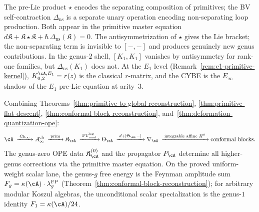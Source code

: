 \begin{remark}
\label{rem:pre-lie-quantization}
The pre-Lie product $\star$ encodes the separating
composition of primitives; the BV self-contraction
$\Delta_{\mathrm{ns}}$ is a separate unary operation
encoding non-separating loop production.  Both appear
in the primitive master equation
$d\mathfrak{K} + \mathfrak{K} \star \mathfrak{K}
+ \hbar\,\Delta_{\mathrm{ns}}(\mathfrak{K}) = 0$.
The antisymmetrization of $\star$ gives the
Lie bracket; the non-separating term is invisible
to $[-,-]$ and produces genuinely new genus contributions.
In the genus-$2$ shell, $[K_1,K_1]$ vanishes by
antisymmetry for rank-one families, but
$\Delta_{\mathrm{ns}}(K_1)$ does not.
At the $E_1$ level
(Remark~\ref{rem:e1-primitive-kernel}),
$K_{0,2}^{\cA,E_1} = r(z)$ is the classical $r$-matrix,
and the CYBE is the $E_\infty$ shadow of the $E_1$
pre-Lie equation at arity~$3$.
\end{remark}

\begin{remark}
\label{rem:circle-closes}
Combining Theorems~\ref{thm:primitive-to-global-reconstruction},
\ref{thm:primitive-flat-descent},
\ref{thm:conformal-block-reconstruction},
and~\ref{thm:deformation-quantization-ope}:
\[
\cA
\;\xrightarrow{\;\mathrm{Ch}_\infty\;}
A^{\mathrm{ch}}_\infty
\;\xrightarrow{\;\mathrm{prim}\;}
\mathfrak{K}_\cA
\;\xrightarrow{\;\mathrm{FT}^{\log}_{\mathrm{mod}}\;}
\Theta_\cA
\;\xrightarrow{\;d + [\Theta_\cA, -]\;}
\nabla_\cA
\;\xrightarrow{\;\text{integrable affine }H^0\;}
\text{conformal blocks}.
\]
The genus-zero OPE data $\mathfrak{K}_\cA^{(0)}$ and the
propagator $P_\cA$ determine all higher-genus corrections via
the primitive master equation.
On the proved uniform-weight scalar lane, the genus-$g$ free
energy is the Feynman amplitude sum
$F_g = \kappa(\cA) \cdot \lambda_g^{\mathrm{FP}}$
(Theorem~\ref{thm:conformal-block-reconstruction}); for arbitrary
modular Koszul algebras, the unconditional scalar specialization is
the genus-$1$ identity $F_1 = \kappa(\cA)/24$.
\end{remark}

